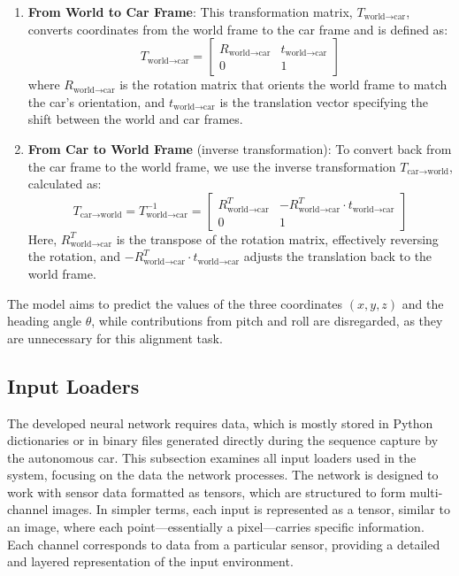 \begin{enumerate}
    \item \textbf{From World to Car Frame}: This transformation matrix, \( T_{\text{world} \to \text{car}} \), converts coordinates from the world frame to the car frame and is defined as:
    \begin{equation}
        T_{\text{world} \to \text{car}} = \begin{bmatrix} R_{\text{world} \to \text{car}} & t_{\text{world} \to \text{car}} \\ 0 & 1 \end{bmatrix}
    \end{equation}
    where \( R_{\text{world} \to \text{car}} \) is the rotation matrix that orients the world frame to match the car's orientation, and \( t_{\text{world} \to \text{car}} \) is the translation vector specifying the shift between the world and car frames.

    \item \textbf{From Car to World Frame} (inverse transformation): To convert back from the car frame to the world frame, we use the inverse transformation \( T_{\text{car} \to \text{world}} \), calculated as:
    \begin{equation}
        T_{\text{car} \to \text{world}} = T_{\text{world} \to \text{car}}^{-1} = \begin{bmatrix} R_{\text{world} \to \text{car}}^T & -R_{\text{world} \to \text{car}}^T \cdot t_{\text{world} \to \text{car}} \\ 0 & 1 \end{bmatrix}
    \end{equation}
    Here, \( R_{\text{world} \to \text{car}}^T \) is the transpose of the rotation matrix, effectively reversing the rotation, and \( -R_{\text{world} \to \text{car}}^T \cdot t_{\text{world} \to \text{car}} \) adjusts the translation back to the world frame.
    
\end{enumerate}

The model aims to predict the values of the three coordinates \( (x, y, z) \) and the heading angle \( \theta \), while contributions from pitch and roll are disregarded, as they are unnecessary for this alignment task.

\subsection{Input Loaders}
The developed neural network requires data, which is mostly stored in Python dictionaries or in binary files generated directly during the sequence capture by the autonomous car.
This subsection examines all input loaders used in the system, focusing on the data the network processes. The network is designed to work with sensor data formatted as tensors, which are structured to form multi-channel images.
In simpler terms, each input is represented as a tensor, similar to an image, where each point—essentially a pixel—carries specific information. Each channel corresponds to data from a particular sensor, providing a detailed and layered representation of the input environment.

